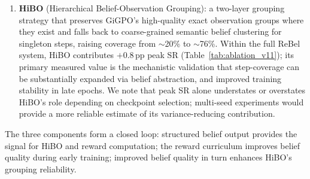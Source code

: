 \documentclass{article}
\begin{document}
\begin{enumerate}[leftmargin=1.5em,itemsep=3pt]
  \item \textbf{HiBO} (Hierarchical Belief-Observation Grouping): a two-layer
    grouping strategy that preserves GiGPO's high-quality exact observation groups
    where they exist and falls back to coarse-grained semantic belief clustering
    for singleton steps, raising coverage from $\sim$20\% to $\sim$76\%.
    Within the full ReBel system, HiBO contributes $+$0.8\,pp peak SR
    (Table~\ref{tab:ablation_v11}); its primary measured value is the mechanistic
    validation that step-coverage can be substantially expanded via belief
    abstraction, and improved training stability in late epochs.
    We note that peak SR alone understates or overstates HiBO's role
    depending on checkpoint selection; multi-seed experiments would provide
    a more reliable estimate of its variance-reducing contribution.
\end{enumerate}

The three components form a closed loop: structured belief output provides the
signal for HiBO and reward computation; the reward curriculum improves belief
quality during early training; improved belief quality in turn enhances HiBO's
grouping reliability.
\end{document}
